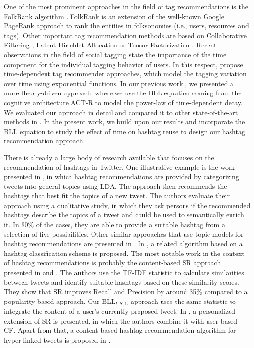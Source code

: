\documentclass{sig-alternate-05-2015}
\begin{document}
One of the most prominent approaches in the field of tag recommendations is the FolkRank algorithm \cite{hotho2006folkrank,jaschke2007tag,jaschke2008tag}. FolkRank is an extension of the well-known Google PageRank approach to rank the entities in folksonomies (i.e., users, resources and tags). Other important tag recommendation methods are based on Collaborative Filtering \cite{marinho2008collaborative,gemmell2009improving}, Latent Dirichlet Allocation \cite{krestel2009latent,krestel2012personalized} or Tensor Factorization \cite{rendle2010pairwise,rendle2009learning}. Recent observations in the field of social tagging state the importance of the time component for the individual tagging behavior of users. In this respect, \cite{zhang2012integrating,yin2011exploiting,yin2011temporal} propose time-dependent tag recommender approaches, which model the tagging variation over time using exponential functions. In our previous work \cite{www_bll,Kowald2016a}, we presented a more theory-driven approach, where we use the BLL equation coming from the cognitive architecture ACT-R \cite{anderson_reflections_1991,anderson2004integrated} to model the power-law of time-dependent decay. We evaluated our approach in detail and compared it to other state-of-the-art methods in \cite{Kowald2015}. In the present work, we build upon our results and incorporate the BLL equation to study the effect of time on hashtag reuse to design our hashtag recommendation approach.

There is already a large body of research available that focuses on the recommendation of hashtags in Twitter. One illustrative example is the work presented in \cite{Godin2013}, in which hashtag recommendations are provided by categorizing tweets into general topics using LDA. The approach then recommends the hashtags that best fit the topics of a new tweet. The authors evaluate their approach using a qualitative study, in which they ask persons if the recommended hashtags describe the topics of a tweet and could be used to semantically enrich it. In 80\% of the cases, they are able to provide a suitable hashtag from a selection of five possibilities. Other similar approaches that use topic models for hashtag recommendations are presented in \cite{She2014,wang2014tag,xu2015personalized,efron2010hashtag}. In \cite{jeon2014hashtag}, a related algorithm based on a hashtag classification scheme is proposed. 
%
The most notable work in the context of hashtag recommendations is probably the content-based SR approach presented in \cite{zangerle2011recommending} and \cite{zangerle2013impact}. The authors use the TF-IDF statistic to calculate similarities between tweets and identify suitable hashtags based on these similarity scores. They show that SR improves Recall and Precision by around 35\% compared to a popularity-based approach. Our BLL$_{I,S,C}${} approach uses the same statistic to integrate the content of a user's currently proposed tweet. In \cite{kywe2012recommending}, a personalized extension of SR is presented, in which the authors combine it with user-based CF. Apart from that, a content-based hashtag recommendation algorithm for hyper-linked tweets is proposed in \cite{sedhai2014hashtag}.
%
\end{document}
